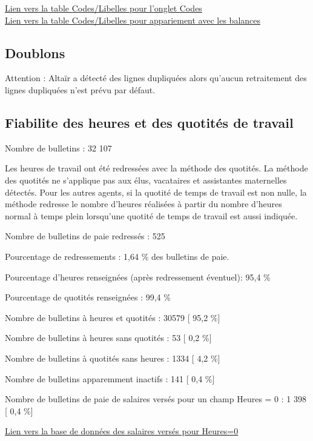 \href{../Bases/Fiabilite/code.libelle.short.csv}{Lien vers la table
Codes/Libelles pour l'onglet Codes}\\
\href{../Bases/Fiabilite/code.libelle.csv}{Lien vers la table
Codes/Libelles pour appariement avec les balances}

\hypertarget{doublons}{%
\subsection{Doublons}\label{doublons}}

Attention : Altaïr a détecté des lignes dupliquées alors qu'aucun
retraitement des lignes dupliquées n'est prévu par défaut.

\hypertarget{fiabilite-des-heures-et-des-quotites-de-travail}{%
\subsection{Fiabilite des heures et des quotités de
travail}\label{fiabilite-des-heures-et-des-quotites-de-travail}}

Nombre de bulletins : 32 107

Les heures de travail ont été redressées avec la méthode des quotités.
La méthode des quotités ne s'applique pas aux élus, vacataires et
assistantes maternelles détectés. Pour les autres agents, si la quotité
de temps de travail est non nulle, la méthode redresse le nombre
d'heures réalisées à partir du nombre d'heures normal à temps plein
lorsqu'une quotité de temps de travail est aussi indiquée.

Nombre de bulletins de paie redressés : 525

Pourcentage de redressements : 1,64 \% des bulletins de paie.

Pourcentage d'heures renseignées (après redressement éventuel): 95,4 \%

Pourcentage de quotités renseignées : 99,4 \%

Nombre de bulletins à heures et quotités : 30579 {[} 95,2 \%{]}

Nombre de bulletins à heures sans quotités : 53 {[} 0,2 \%{]}

Nombre de bulletins à quotités sans heures : 1334 {[} 4,2 \%{]}

Nombre de bulletins apparemment inactifs : 141 {[} 0,4 \%{]}

Nombre de bulletins de paie de salaires versés pour un champ Heures = 0
: 1 398 {[} 0,4 \%{]}

\href{../Bases/Fiabilite/base.heures.nulles.salaire.nonnull.csv}{Lien vers
la base de données des salaires versés pour Heures=0}

